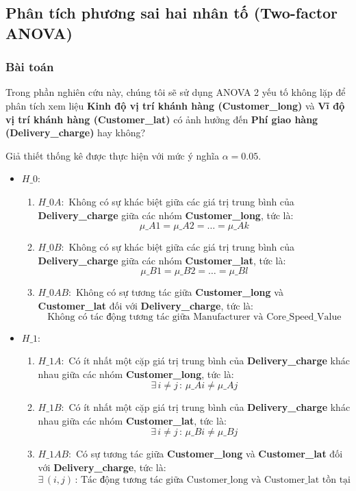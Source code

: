\subsection{Phân tích phương sai hai nhân tố (Two-factor ANOVA)}
\subsubsection{Bài toán}
Trong phần nghiên cứu này, chúng tôi sẽ sử dụng ANOVA 2 yếu tố không lặp để phân tích xem liệu \textbf{Kinh độ vị trí khánh hàng (Customer\_long)} và \textbf{Vĩ độ vị trí khánh hàng (Customer\_lat)} có ảnh hưởng đến \textbf{Phí giao hàng (Delivery\_charge)} hay không?

Giả thiết thống kê được thực hiện với mức ý nghĩa $\alpha = 0.05$.

\begin{itemize}
    \item \( H\_0 \): 
    \begin{enumerate}
        \item \( H\_{0A}: \) Không có sự khác biệt giữa các giá trị trung bình của \textbf{Delivery\_charge} giữa các nhóm \textbf{Customer\_long}, tức là:
        \[
        \mu\_{A1} = \mu\_{A2} = \ldots = \mu\_{Ak}
        \]
        \item \( H\_{0B}: \) Không có sự khác biệt giữa các giá trị trung bình của \textbf{Delivery\_charge} giữa các nhóm \textbf{Customer\_lat}, tức là:
        \[
        \mu\_{B1} = \mu\_{B2} = \ldots = \mu\_{Bl}
        \]
        \item \( H\_{0AB}: \) Không có sự tương tác giữa \textbf{Customer\_long} và \textbf{Customer\_lat} đối với \textbf{Delivery\_charge}, tức là:
        \[
        \text{Không có tác động tương tác giữa Manufacturer và Core\_Speed\_Value}
        \]
    \end{enumerate}
    
    \item \( H\_1 \): 
    \begin{enumerate}
        \item \( H\_{1A}: \) Có ít nhất một cặp giá trị trung bình của \textbf{Delivery\_charge} khác nhau giữa các nhóm \textbf{Customer\_long}, tức là:
        \[
        \exists \, i \neq j \, : \, \mu\_{Ai} \neq \mu\_{Aj}
        \]
        \item \( H\_{1B}: \) Có ít nhất một cặp giá trị trung bình của \textbf{Delivery\_charge} khác nhau giữa các nhóm \textbf{Customer\_lat}, tức là:
        \[
        \exists \, i \neq j \, : \, \mu\_{Bi} \neq \mu\_{Bj}
        \]
        \item \( H\_{1AB}: \) Có sự tương tác giữa \textbf{Customer\_long} và \textbf{Customer\_lat} đối với \textbf{Delivery\_charge}, tức là:
        \[
        \exists \, (i, j) \, : \, \text{Tác động tương tác giữa Customer\_long và Customer\_lat tồn tại}
        \]
    \end{enumerate}
\end{itemize}

